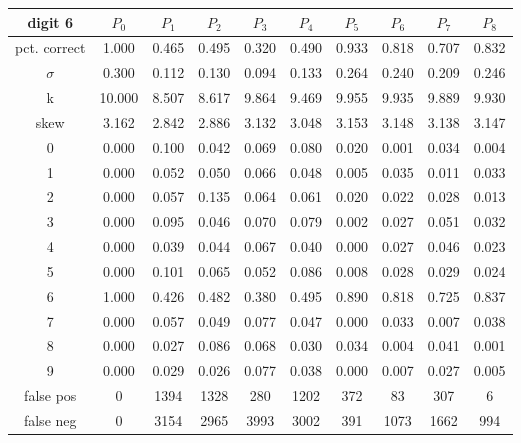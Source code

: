 \documentclass{report}
\begin{document}
\begin{tabular}{ | c ||  c | c | c | c | c | c | c | c | c |}
 digit 6 & $P_0$ & $P_1$ & $P_2$ & $P_3$ & $P_4$ & $P_5$ & $P_6$ & $P_7$ & $P_8$ \\
\hline \hline
pct. correct  & 1.000 & 0.465 & 0.495 & 0.320 & 0.490 & 0.933 & 0.818 & 0.707 & 0.832 \\
\hline
$\sigma$ & 0.300& 0.112& 0.130& 0.094& 0.133& 0.264& 0.240& 0.209& 0.246 \\
\hline
k & 10.000& 8.507& 8.617& 9.864& 9.469& 9.955& 9.935& 9.889& 9.930 \\
\hline
skew & 3.162& 2.842& 2.886& 3.132& 3.048& 3.153& 3.148& 3.138& 3.147 \\
\hline
0 & 0.000 & 0.100 & 0.042 & 0.069 & 0.080 & 0.020 & 0.001 & 0.034 & 0.004 \\
\hline
1 & 0.000 & 0.052 & 0.050 & 0.066 & 0.048 & 0.005 & 0.035 & 0.011 & 0.033 \\
\hline
2 & 0.000 & 0.057 & 0.135 & 0.064 & 0.061 & 0.020 & 0.022 & 0.028 & 0.013 \\
\hline
3 & 0.000 & 0.095 & 0.046 & 0.070 & 0.079 & 0.002 & 0.027 & 0.051 & 0.032 \\
\hline
4 & 0.000 & 0.039 & 0.044 & 0.067 & 0.040 & 0.000 & 0.027 & 0.046 & 0.023 \\
\hline
5 & 0.000 & 0.101 & 0.065 & 0.052 & 0.086 & 0.008 & 0.028 & 0.029 & 0.024 \\
\hline
6 & 1.000 & 0.426 & 0.482 & 0.380 & 0.495 & 0.890 & 0.818 & 0.725 & 0.837 \\
\hline
7 & 0.000 & 0.057 & 0.049 & 0.077 & 0.047 & 0.000 & 0.033 & 0.007 & 0.038 \\
\hline
8 & 0.000 & 0.027 & 0.086 & 0.068 & 0.030 & 0.034 & 0.004 & 0.041 & 0.001 \\
\hline
9 & 0.000 & 0.029 & 0.026 & 0.077 & 0.038 & 0.000 & 0.007 & 0.027 & 0.005 \\
\hline
false pos  & 0 & 1394 & 1328 & 280 & 1202 & 372 & 83 & 307 & 6 \\
\hline
false neg  & 0 & 3154 & 2965 & 3993 & 3002 & 391 & 1073 & 1662 & 994 \\
\hline
\end{tabular}


\newpage
\end{document}
